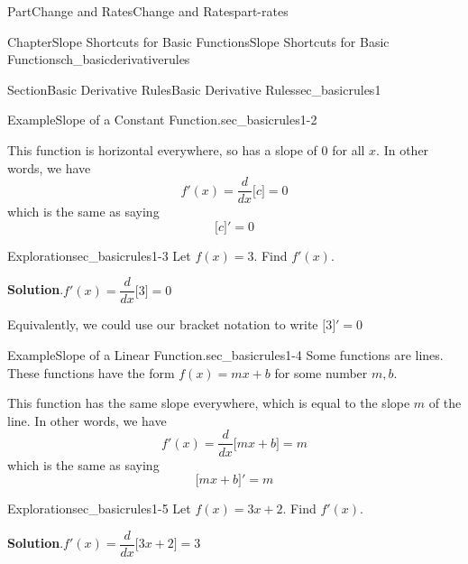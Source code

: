 \documentclass[oneside,10pt,]{tufte-book}
\newcommand{\blocktitlefont}{\relax}
\numberwithin{equation}{chapter}
\newcommand{\ddx}[1]{ \dfrac{d}{dx} \Big[ #1 \Big]  }
\newcommand{\D}[1]{ \Big[ #1 \Big]'  }
\begin{document}
\begin{partptx}{Part}{Change and Rates}{}{Change and Rates}{}{}{part-rates}
\begin{chapterptx}{Chapter}{Slope Shortcuts for Basic Functions}{}{Slope Shortcuts for Basic Functions}{}{}{ch_basicderivativerules}
\begin{sectionptx}{Section}{Basic Derivative Rules}{}{Basic Derivative Rules}{}{}{sec_basicrules1}
\begin{example}{Example}{Slope of a Constant Function.}{sec_basicrules1-2}
\begin{image}{0.25}{0.5}{0.25}{}
{
}%
\end{image}%
 This function is horizontal everywhere, so has a slope of \(0\) for all \(x\).  In other words, we have%
\begin{equation*}
f'(x) = \ddx{c} = 0 
\end{equation*}
which is the same as saying%
\begin{equation*}
\D{ c } = 0
\end{equation*}
%
\end{example}
\begin{exploration}{Exploration}{}{sec_basicrules1-3}%
Let \(f(x) = 3\).  Find \(f'(x)\).%
\par\smallskip%
\noindent\textbf{\blocktitlefont Solution}.\hypertarget{sec_basicrules1-3-2}{}\quad{}\(f'(x) = \ddx{3} = 0\)%
\par
Equivalently, we could use our bracket notation to write \(\D{ 3 } = 0\)%
\end{exploration}%
\begin{example}{Example}{Slope of a Linear Function.}{sec_basicrules1-4}%
Some functions are lines.  These functions have the form \(f(x) = m x + b\) for some number \(m,b\). \begin{image}{0.25}{0.5}{0.25}{}%
%
\end{image}%
 This function has the same slope everywhere, which is equal to the slope \(m\) of the line.  In other words, we have%
\begin{equation*}
f'(x) = \ddx{ m x + b } = m  
\end{equation*}
which is the same as saying%
\begin{equation*}
\D{ m x + b} = m
\end{equation*}
%
\end{example}
\begin{exploration}{Exploration}{}{sec_basicrules1-5}%
Let \(f(x) = 3x + 2\).  Find \(f'(x) \).%
\par\smallskip%
\noindent\textbf{\blocktitlefont Solution}.\hypertarget{sec_basicrules1-5-2}{}\quad{}\(f'(x) = \ddx{3x + 2} = 3\)%

\end{exploration}
\end{sectionptx}
\end{chapterptx}
\end{partptx}
\end{document}
